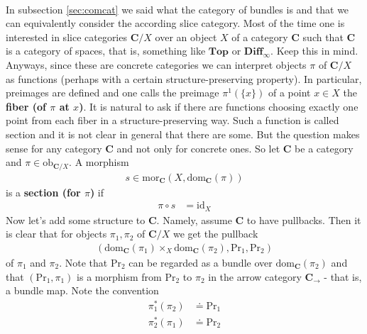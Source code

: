 \\
\begin{exa}[Bundles 1]
\label{exa:bundles1}
In subsection \ref{sec:comcat} we said what the category of bundles is and that we can equivalently consider the according slice category. Most of the time one is interested in slice categories $\mathbf{C} \slash X$ over an object $X$ of a category $\mathbf{C}$ such that $\mathbf{C}$ is a category of spaces, that is, something like $\mathbf{Top}$ or $\mathbf{Diff}_{\infty}$. Keep this in mind. Anyways, since these are concrete categories we can interpret objects $\pi$ of $\mathbf{C} \slash X$ as functions (perhaps with a certain structure-preserving property). In particular, preimages are defined and one calls the preimage $\pi^{1}(\lbrace x \rbrace)$ of a point $x \in X$ the \textbf{fiber (of $\pi$ at $x$)}. It is natural to ask if there are functions choosing exactly one point from each fiber in a structure-preserving way. Such a function is called section and it is not clear in general that there are some. But the question makes sense for any category $\mathbf{C}$ and not only for concrete ones. So let $\mathbf{C}$ be a category and $\pi \in \mathrm{ob}_{\mathbf{C} \slash X}$. A morphism
\begin{align*}
  s
  \in
  \mathrm{mor}_{\mathbf{C}}
  \left(
    X,
    \mathrm{dom}_{\mathbf{C}}(\pi)
  \right)
\end{align*}
is a \textbf{section (for $\pi$)} if
\begin{align*}
  \pi
  \circ
  s
  &=
  \mathrm{id}_{X}
\end{align*}
Now let's add some structure to $\mathbf{C}$. Namely, assume $\mathbf{C}$ to have pullbacks. Then it is clear that for objects $\pi_{1},\pi_{2}$ of $\mathbf{C} \slash X$ we get the pullback
\begin{align*}
  \left(
    \mathrm{dom}_{\mathbf{C}}(\pi_{1})
    \times_{X}
    \mathrm{dom}_{\mathbf{C}}(\pi_{2}),
    \mathrm{Pr}_{1},
    \mathrm{Pr}_{2}
  \right)
\end{align*}
of $\pi_{1}$ and $\pi_{2}$. Note that $\mathrm{Pr}_{2}$ can be regarded as a bundle over $\mathrm{dom}_{\mathbf{C}}(\pi_{2})$ and that $(\mathrm{Pr}_{1},\pi_{1})$ is a morphism from $\mathrm{Pr}_{2}$ to $\pi_{2}$ in the arrow category $\mathbf{C}_{\rightarrow}$ - that is, a bundle map. Note the convention
\begin{align*}
  \pi_{1}^{\ast}(\pi_{2})
  &\doteq
  \mathrm{Pr}_{1}
  \\
  \pi_{2}^{\ast}(\pi_{1})
  &\doteq
  \mathrm{Pr}_{2}
\end{align*}

\end{exa}
